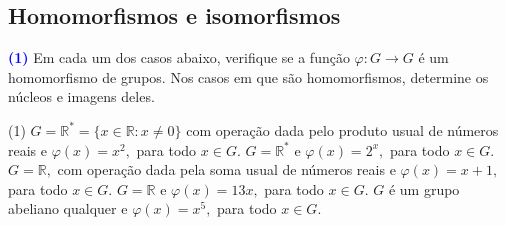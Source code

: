 \documentclass[12pt, a4paper]{article}
\newcommand{\negrito}[1]{\mbox{\boldmath{$#1$}}}
\begin{document}
\subsection{\textcolor{Floresta}{Homomorfismos e isomorfismos}}
\textcolor{blue}{\bf(1)}\label{57} Em cada um dos casos abaixo, verifique se a função $\varphi \colon G \to G$ é um homomorfismo de grupos. Nos casos em que são homomorfismos, determine os núcleos e imagens deles.
\begin{tasks}[counter-format={(tsk[a])},label-width=3.6ex, label-format = {\bfseries}, column-sep = {0pt}](1)
\task[\textcolor{Floresta}{$\negrito{(a)} $}] $G = \mathbb{R}^{*} = \{ x \in \mathbb{R} : x \neq 0 \}$ com operação dada pelo produto usual de números reais e $\varphi(x) = x^2,$ para todo $x \in G.$
\task[\textcolor{Floresta}{$\negrito{(b)} $}] $G = \mathbb{R}^{*}$ e $\varphi(x) = 2^x,$ para todo $x \in G.$
\task[\textcolor{Floresta}{$\negrito{(c)} $}] $G = \mathbb{R},$ com operação dada pela soma usual de números reais e $\varphi(x) = x + 1,$ para todo $x \in G.$
\task[\textcolor{Floresta}{$\negrito{(d)} $}] $G = \mathbb{R}$ e $\varphi(x) = 13x,$ para todo $x \in G.$
\task[\textcolor{Floresta}{$\negrito{(e)} $}] $G$ é um grupo abeliano qualquer e $\varphi(x) = x^5,$ para todo $x \in G.$
\end{tasks}
\end{document}

